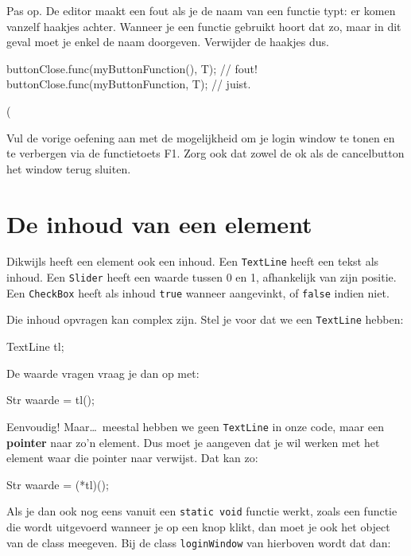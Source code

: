 \begin{note}
Pas op. De editor maakt een fout als je de naam van een functie typt: er komen vanzelf haakjes achter. Wanneer je een functie gebruikt hoort dat zo, maar in dit geval moet je enkel de naam doorgeven. Verwijder de haakjes dus.
\begin{code}
buttonClose.func(myButtonFunction(), T); // fout!
buttonClose.func(myButtonFunction, T);   // juist.
\end{code}
\end{note}
(
\begin{exercise}
Vul de vorige oefening aan met de mogelijkheid om je login window te tonen en te verbergen via de functietoets F1. Zorg ook dat zowel de ok als de cancelbutton het window terug sluiten.
\end{exercise}

\section{De inhoud van een element}
\label{chapter:gui_content}
Dikwijls heeft een element ook een inhoud. Een \texttt{TextLine} heeft een tekst als inhoud. Een \texttt{Slider} heeft een waarde tussen 0 en 1, afhankelijk van zijn positie. Een \texttt{CheckBox} heeft als inhoud \texttt{true} wanneer aangevinkt, of \texttt{false} indien niet. 

Die inhoud opvragen kan complex zijn. Stel je voor dat we een \texttt{TextLine} hebben:

\begin{code}
TextLine tl;
\end{code}

De waarde vragen vraag je dan op met:

\begin{code}
Str waarde = tl();
\end{code}

Eenvoudig! Maar\ldots\ meestal hebben we geen \texttt{TextLine} in onze code, maar een \textbf{pointer} naar zo'n element. Dus moet je aangeven dat je wil werken met het element waar die pointer naar verwijst. Dat kan zo:

\begin{code}
Str waarde = (*tl)();
\end{code}

Als je dan ook nog eens vanuit een \texttt{static void} functie werkt, zoals een functie die wordt uitgevoerd wanneer je op een knop klikt, dan moet je ook het object van de class meegeven. Bij de class \texttt{loginWindow} van hierboven wordt dat dan:

